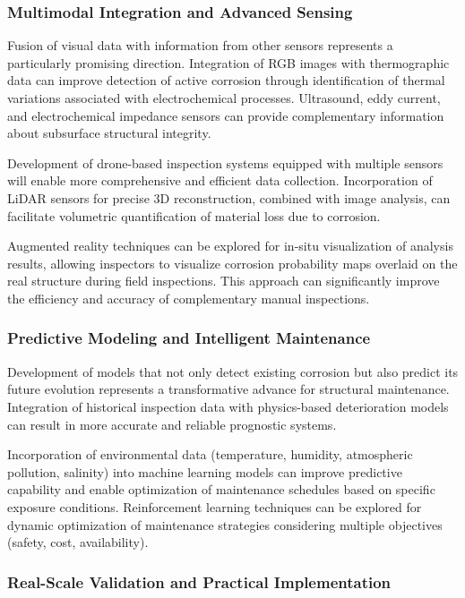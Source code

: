 \documentclass[12pt,a4paper,twoside]{article}
\begin{document}
\subsubsection{Multimodal Integration and Advanced Sensing}

Fusion of visual data with information from other sensors represents a particularly promising direction. Integration of RGB images with thermographic data can improve detection of active corrosion through identification of thermal variations associated with electrochemical processes. Ultrasound, eddy current, and electrochemical impedance sensors can provide complementary information about subsurface structural integrity.

Development of drone-based inspection systems equipped with multiple sensors will enable more comprehensive and efficient data collection. Incorporation of LiDAR sensors for precise 3D reconstruction, combined with image analysis, can facilitate volumetric quantification of material loss due to corrosion.

Augmented reality techniques can be explored for in-situ visualization of analysis results, allowing inspectors to visualize corrosion probability maps overlaid on the real structure during field inspections. This approach can significantly improve the efficiency and accuracy of complementary manual inspections.

\subsubsection{Predictive Modeling and Intelligent Maintenance}

Development of models that not only detect existing corrosion but also predict its future evolution represents a transformative advance for structural maintenance. Integration of historical inspection data with physics-based deterioration models can result in more accurate and reliable prognostic systems.

Incorporation of environmental data (temperature, humidity, atmospheric pollution, salinity) into machine learning models can improve predictive capability and enable optimization of maintenance schedules based on specific exposure conditions. Reinforcement learning techniques can be explored for dynamic optimization of maintenance strategies considering multiple objectives (safety, cost, availability).

\subsubsection{Real-Scale Validation and Practical Implementation}
\end{document}
